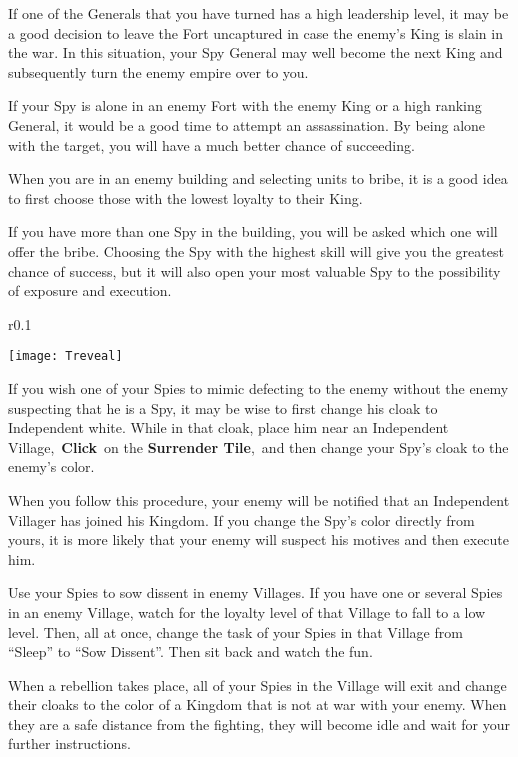 If one of the Generals that you have turned has a high leadership level, it may be a good decision to leave the Fort uncaptured in case the enemy’s King is slain in the war. In this situation, your Spy General may well become the next King and subsequently turn the enemy empire over to you.

If your Spy is alone in an enemy Fort with the enemy King or a high ranking General, it would be a good time to attempt an assassination. By being alone with the target, you will have a much better chance of succeeding.

When you are in an enemy building and selecting units to bribe, it is a good idea to first choose those with the lowest loyalty to their King.

If you have more than one Spy in the building, you will be asked which one will offer the bribe. Choosing the Spy with the highest skill will give you the greatest chance of success, but it will also open your most valuable Spy to the possibility of exposure and execution.

\begin{wrapfigure}{r}{0.1\textwidth}
	\vspace{-20pt}
	\begin{center}
		\texttt{[image: Treveal]}
	\end{center}
	\vspace{-20pt}
\end{wrapfigure}

If you wish one of your Spies to mimic defecting to the enemy without the enemy suspecting that he is a Spy, it may be wise to first change his cloak to Independent white. While in that cloak, place him near an Independent Village, \textbf{Click} on the \textbf{Surrender Tile}, and then change your Spy’s cloak to the enemy’s color.

When you follow this procedure, your enemy will be notified that an Independent Villager has joined his Kingdom. If you change the Spy’s color directly from yours, it is more likely that your enemy will suspect his motives and then execute him.

Use your Spies to sow dissent in enemy Villages. If you have one or several Spies in an enemy Village, watch for the loyalty level of that Village to fall to a low level. Then, all at once, change the task of your Spies in that Village from “Sleep” to “Sow Dissent”. Then sit back and watch the fun.

When a rebellion takes place, all of your Spies in the Village will exit and change their cloaks to the color of a Kingdom that is not at war with your enemy. When they are a safe distance from the fighting, they will become idle and wait for your further instructions.

